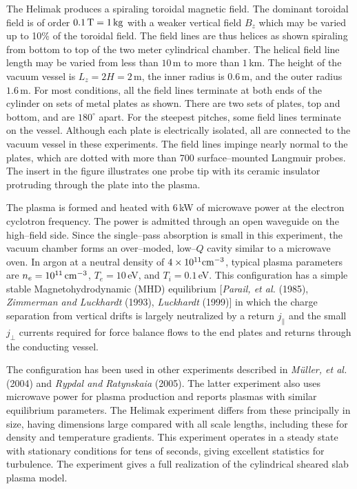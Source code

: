 \documentclass[a4paper,openany,12pt]{book}
\begin{document}
The Helimak produces a spiraling toroidal magnetic field. The dominant toroidal field is of order $0.1\,\rm T=1\,kg$ with a weaker vertical field $B_z$ which may be varied up to 10\% of the toroidal field. The field lines are thus helices as shown spiraling from bottom to top of the two meter cylindrical chamber. The helical field line length may be varied from less than $10\,$m to more than $1\,$km. The height of the vacuum vessel is $L_z = 2H = 2\,$m, the inner radius is $0.6\,$m, and the outer radius $1.6\,$m. For most conditions, all the field lines terminate at both ends of the cylinder on sets of metal plates as shown. There are two sets of plates, top and bottom, and are $180^\circ$ apart. For the steepest pitches, some field lines terminate on the vessel. Although each plate is electrically isolated, all are connected to the vacuum vessel in these experiments. The field lines impinge nearly normal to the plates, which are dotted with more than 700 surface--mounted Langmuir probes. The insert in the figure illustrates one probe tip with its ceramic insulator protruding through the plate into the plasma. 

The plasma is formed and heated with $6\,$kW of microwave power at the electron cyclotron frequency. The power is admitted through an open waveguide on the high--field side. Since the single--pass absorption is small in this experiment, the vacuum chamber forms an over--moded, low--$Q$ cavity similar to a microwave oven. In argon at a neutral density of $4\times 10^{11}\rm cm^{-3}$, typical plasma parameters are $n_e = 10^{11}\,\rm cm^{-3}$, $T_e = 10\,$eV, and $T_i = 0.1\,$eV. This configuration has a simple stable Magnetohydrodynamic (MHD) equilibrium [\emph{Parail, et al.} (1985), \emph{Zimmerman and Luckhardt} (1993), \emph{Luckhardt} (1999)] in which the charge separation from vertical drifts is largely neutralized by a return $j_\|$ and the small $j_\perp$ currents required for force balance flows to the end plates and returns through the conducting vessel. 

The configuration has been used in other experiments described in \emph{M\"uller, et al.} (2004) and \emph{Rypdal and Ratynskaia} (2005). The latter experiment also uses microwave power for plasma production and reports plasmas with similar equilibrium parameters. The Helimak experiment differs from these principally in size, having dimensions large compared with all scale lengths, including these for density and temperature gradients. This experiment operates in a steady state with stationary conditions for tens of seconds, giving excellent statistics for turbulence. The experiment gives a full realization of the cylindrical sheared slab plasma model. 
\end{document}
